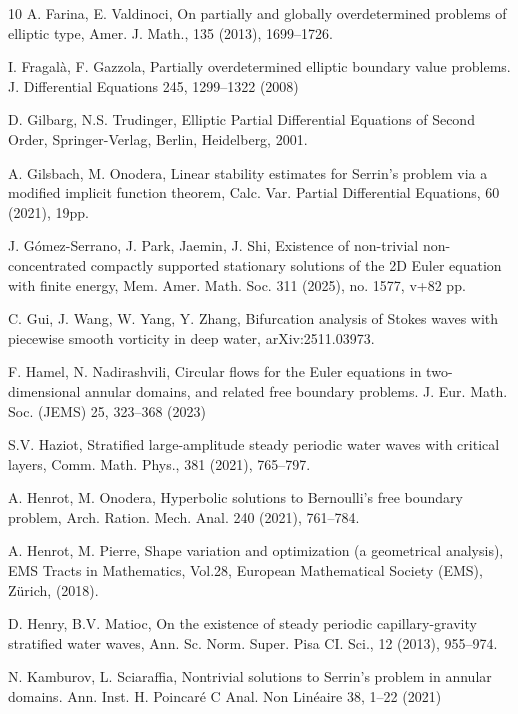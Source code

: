 \documentclass[reqno]{amsart}
\numberwithin{equation}{section}
\numberwithin{equation}{section}
\numberwithin{equation}{section}
\begin{document}
\begin{thebibliography}{10}
 A. Farina, E. Valdinoci, On partially and globally overdetermined problems of elliptic type, Amer. J. Math., 135 (2013), 1699--1726.

 I. Fragal\`{a}, F. Gazzola, Partially overdetermined elliptic boundary value problems. J. Differential Equations 245, 1299--1322 (2008)

 D. Gilbarg, N.S. Trudinger, Elliptic Partial Differential Equations of Second Order, Springer-Verlag, Berlin, Heidelberg, 2001.

 A. Gilsbach, M. Onodera, Linear stability estimates for Serrin's problem via a modified implicit function theorem, Calc. Var. Partial Differential Equations, 60 (2021), 19pp.

   J. G\'{o}mez-Serrano, J. Park, Jaemin, J. Shi, Existence of non-trivial non-concentrated compactly supported stationary solutions of the 2D Euler equation with finite energy, Mem. Amer. Math. Soc. 311 (2025), no. 1577, v+82 pp.

 C. Gui, J. Wang, W. Yang, Y. Zhang, Bifurcation analysis of Stokes waves with piecewise smooth vorticity in deep water, arXiv:2511.03973.

 F. Hamel, N. Nadirashvili, Circular flows for the Euler equations in two-dimensional annular
domains, and related free boundary problems. J. Eur. Math. Soc. (JEMS) 25, 323--368 (2023)

 S.V. Haziot, Stratified large-amplitude steady periodic water waves with critical layers, Comm. Math. Phys., 381
(2021), 765--797.

 A. Henrot, M. Onodera, Hyperbolic solutions to Bernoulli's free boundary problem, Arch. Ration. Mech. Anal. 240 (2021), 761--784.

 A. Henrot, M. Pierre, Shape variation and optimization (a geometrical analysis), EMS
Tracts in Mathematics, Vol.28, European Mathematical Society (EMS), Z\"urich, (2018).

 D. Henry, B.V. Matioc, On the existence of steady periodic capillary-gravity stratified water waves, Ann. Sc. Norm.
Super. Pisa CI. Sci., 12 (2013), 955--974.

 N. Kamburov, L. Sciaraffia, Nontrivial solutions to Serrin's problem in annular domains.
Ann. Inst. H. Poincar\'{e} C Anal. Non Lin\'{e}aire 38, 1--22 (2021)



\end{thebibliography}
\end{document}
